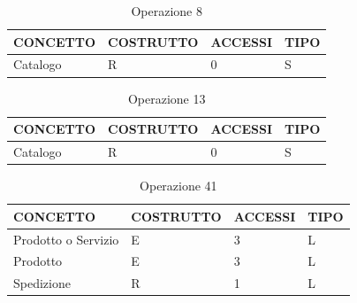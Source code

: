 \begin{table}[H]
\centering
\caption{Operazione 8}
\begin{tabular}{llll}
\\ \hline
\multicolumn{1}{|l|}{\textbf{CONCETTO}} & \multicolumn{1}{l|}{\textbf{COSTRUTTO}} & \multicolumn{1}{l|}{\textbf{ACCESSI}} & \multicolumn{1}{l|}{\textbf{TIPO}} \\ \hline
\multicolumn{1}{|l|}{Catalogo}
& \multicolumn{1}{l|}{R}                  & \multicolumn{1}{l|}{0}                & \multicolumn{1}{l|}{S}             \\ \hline
\end{tabular}
\end{table}

\begin{table}[H]
\centering
\caption{Operazione 13}
\begin{tabular}{llll}
\\ \hline
\multicolumn{1}{|l|}{\textbf{CONCETTO}} & \multicolumn{1}{l|}{\textbf{COSTRUTTO}} & \multicolumn{1}{l|}{\textbf{ACCESSI}} & \multicolumn{1}{l|}{\textbf{TIPO}} \\ \hline
\multicolumn{1}{|l|}{Catalogo}
& \multicolumn{1}{l|}{R}                  & \multicolumn{1}{l|}{0}                & \multicolumn{1}{l|}{S}             \\ \hline
\end{tabular}
\end{table}


\begin{table}[H]
\centering
\caption{Operazione 41}
\begin{tabular}{llll}
\\ \hline
\multicolumn{1}{|l|}{\textbf{CONCETTO}} & \multicolumn{1}{l|}{\textbf{COSTRUTTO}} & \multicolumn{1}{l|}{\textbf{ACCESSI}} & \multicolumn{1}{l|}{\textbf{TIPO}} \\ \hline
\multicolumn{1}{|l|}{Prodotto o Servizio}             & \multicolumn{1}{l|}{E}                  & \multicolumn{1}{l|}{3}        
& \multicolumn{1}{l|}{L}             
			 \\ \hline
\multicolumn{1}{|l|}{Prodotto}             & \multicolumn{1}{l|}{E}                  & \multicolumn{1}{l|}{3}        
& \multicolumn{1}{l|}{L}             
			 \\ \hline
\multicolumn{1}{|l|}{Spedizione}
& \multicolumn{1}{l|}{R}                  & \multicolumn{1}{l|}{1}                & \multicolumn{1}{l|}{L}             \\ \hline
\end{tabular}
\end{table}


